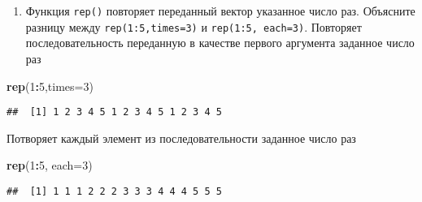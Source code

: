 \documentclass[]{article}
\newenvironment{Shaded}{\begin{snugshade}}{\end{snugshade}}
\newcommand{\KeywordTok}[1]{\textcolor[rgb]{0.13,0.29,0.53}{\textbf{#1}}}
\newcommand{\DataTypeTok}[1]{\textcolor[rgb]{0.13,0.29,0.53}{#1}}
\newcommand{\DecValTok}[1]{\textcolor[rgb]{0.00,0.00,0.81}{#1}}
\newcommand{\OperatorTok}[1]{\textcolor[rgb]{0.81,0.36,0.00}{\textbf{#1}}}
\newcommand{\NormalTok}[1]{#1}
\providecommand{\tightlist}{%
  \setlength{\itemsep}{0pt}\setlength{\parskip}{0pt}}
\begin{document}
\begin{enumerate}
\def\labelenumi{\arabic{enumi}.}
\setcounter{enumi}{1}
\tightlist
\item
  Функция \texttt{rep()} повторяет переданный вектор указанное число
  раз. Объясните разницу между \texttt{rep(1:5,times=3)} и
  \texttt{rep(1:5,\ each=3)}. Повторяет последовательность переданную в
  качестве первого аргумента заданное число раз
\end{enumerate}

\begin{Shaded}
\begin{Highlighting}[]
\KeywordTok{rep}\NormalTok{(}\DecValTok{1}\OperatorTok{:}\DecValTok{5}\NormalTok{,}\DataTypeTok{times=}\DecValTok{3}\NormalTok{)}
\end{Highlighting}
\end{Shaded}

\begin{verbatim}
##  [1] 1 2 3 4 5 1 2 3 4 5 1 2 3 4 5
\end{verbatim}

Потворяет каждый элемент из последовательности заданное число раз

\begin{Shaded}
\begin{Highlighting}[]
\KeywordTok{rep}\NormalTok{(}\DecValTok{1}\OperatorTok{:}\DecValTok{5}\NormalTok{, }\DataTypeTok{each=}\DecValTok{3}\NormalTok{)}
\end{Highlighting}
\end{Shaded}

\begin{verbatim}
##  [1] 1 1 1 2 2 2 3 3 3 4 4 4 5 5 5
\end{verbatim}
\end{document}
